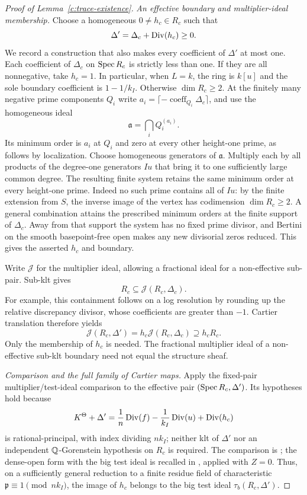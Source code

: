 \begin{proof}[Proof of Lemma~\ref{c:trace-existence}]
\emph{An effective boundary and multiplier-ideal membership.}
Choose a homogeneous $0\ne h_c\in R_c$ such that
\[
 \Delta'=\Delta_c+\operatorname{Div}(h_c)\ge0.
\]
We record a construction that also makes every coefficient of $\Delta'$
at most one.  Each coefficient of $\Delta_c$ on $\operatorname{Spec} R_c$ is strictly
less than one.  If they are all nonnegative, take $h_c=1$.  In particular,
when $L=k$, the ring is $k[u]$ and the sole boundary coefficient is
$1-1/k_I$.  Otherwise $\dim R_c\ge2$.  At the finitely many negative
prime components $Q_i$ write
$a_i=\lceil-\operatorname{coeff}_{Q_i}\Delta_c\rceil$, and use the
homogeneous ideal
\[
 \mathfrak a=\bigcap_i Q_i^{(a_i)}.
\]
Its minimum order is $a_i$ at $Q_i$ and zero at every other height-one
prime, as follows by localization.  Choose homogeneous generators of
$\mathfrak a$.  Multiply each by all products of the degree-one generators
$Iu$ that bring it to one sufficiently large common degree.  The resulting
finite system retains the same minimum order at every height-one prime.
Indeed no such prime contains all of $Iu$: by the finite extension from
$S$, the inverse image of the vertex has codimension $\dim R_c\ge2$.
A general combination attains the prescribed minimum orders at the finite
support of $\Delta_c$.  Away from that support the system has no fixed
prime divisor, and Bertini on the smooth basepoint-free open makes any
new divisorial zeros reduced.  This gives the asserted $h_c$ and boundary.

Write $\mathcal J$ for the multiplier ideal, allowing a fractional ideal
for a non-effective sub-pair.  Sub-klt gives
\[
 R_c\subseteq\mathcal J(R_c,\Delta_c).
\]
For example, this containment follows on a log resolution by rounding up
the relative discrepancy divisor, whose coefficients are greater than
$-1$.  Cartier translation therefore yields
\[
 \mathcal J(R_c,\Delta')
    =h_c\mathcal J(R_c,\Delta_c)\supseteq h_cR_c.
\]
Only the membership of $h_c$ is needed.  The fractional multiplier ideal
of a non-effective sub-klt boundary need not equal the structure sheaf.

\emph{Comparison and the full family of Cartier maps.}
Apply the fixed-pair multiplier/test-ideal comparison to the effective pair
$(\operatorname{Spec} R_c,\Delta')$.  Its hypotheses hold because
\[
 K^\Theta+\Delta'
   =\frac1n\operatorname{Div}(f)-\frac1{k_I}\operatorname{Div}(u)+\operatorname{Div}(h_c)
\]
is rational-principal, with index dividing $nk_I$; neither klt of
$\Delta'$ nor an independent $\mathbb Q$-Gorenstein hypothesis on $R_c$ is
required.  The comparison is \cite[Theorem~3.2]{Takagi}; the dense-open
form with the big test ideal is recalled in
\cite[Theorem~11]{DFDTT}, applied with
$Z=0$.  Thus, on a sufficiently general reduction to a finite residue
field of characteristic $\mathfrak p\equiv1\pmod{nk_I}$, the image of $h_c$ belongs
to the big test ideal $\tau_b(R_c,\Delta')$.


\end{proof}
